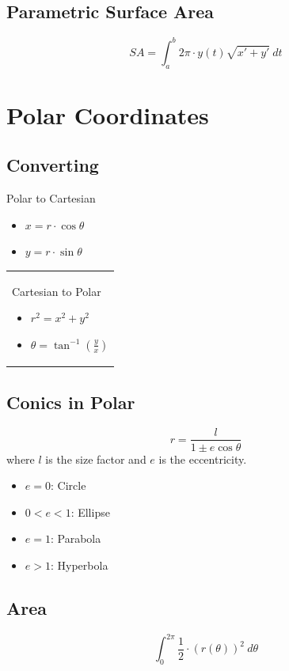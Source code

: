 \documentclass[12pt]{article}
\begin{document}
\subsection{Parametric Surface Area}
$$SA = \int_a^b  2\pi \cdot y(t) \sqrt{x' + y'}\ dt$$

\section{Polar Coordinates}
\subsection{Converting}


\begin{minipage}{0.5\textwidth}
Polar to Cartesian
\begin{itemize}
    \item $x=r\cdot\cos\theta$
    \item $y=r\cdot\sin\theta$
\end{itemize}

\end{minipage}
\begin{minipage}{0.45\textwidth}
\begin{tabular}{|p{\textwidth}}

Cartesian to Polar
\begin{itemize}
    \item $r^2=x^2+y^2$
    \item $\theta=\tan^{-1}\left(\frac{y}{x}\right)$
\end{itemize}
\end{tabular}
\end{minipage}

\subsection{Conics in Polar}
$$r=\frac{l}{1\pm e \cos\theta}$$ where $l$ is the size factor and $e$ is the eccentricity.

\begin{itemize}
    \item $e=0$: Circle
    \item $0<e<1$: Ellipse
    \item $e=1$: Parabola
    \item $e>1$: Hyperbola
\end{itemize}

\subsection{Area}
$$\int_0^{2\pi} \frac{1}{2} \cdot (r(\theta))^2 \ d\theta$$
\end{document}
